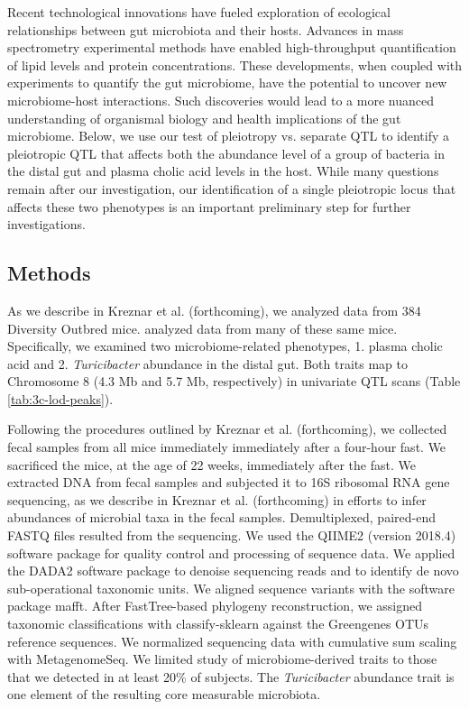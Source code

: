 \documentclass[oneside]{book}
\begin{document}
Recent technological innovations have fueled exploration of ecological relationships between gut microbiota and their hosts. Advances in mass spectrometry experimental methods have enabled high-throughput quantification of lipid levels and protein concentrations. These developments, when coupled with experiments to quantify the gut microbiome, have the potential to uncover new microbiome-host interactions. Such discoveries would lead to a more nuanced understanding of organismal biology and health implications of the gut microbiome. Below, we use our test of pleiotropy vs. separate QTL to identify a pleiotropic QTL that affects both the abundance level of a group of bacteria in the distal gut and plasma cholic acid levels in the host. While many questions remain after our investigation, our identification of a single pleiotropic locus that affects these two phenotypes is an important preliminary step for further investigations.  



\subsection{Methods}

As we describe in Kreznar et al. (forthcoming), we analyzed data from 384 Diversity Outbred mice. \citet{keller2018genetic} analyzed data from many of these same mice. Specifically, we examined two microbiome-related phenotypes, 1. plasma cholic acid and 2. \emph{Turicibacter} abundance in the distal gut. Both traits map to Chromosome 8 (4.3 Mb and 5.7 Mb, respectively) in univariate QTL scans (Table \ref{tab:3c-lod-peaks}).

Following the procedures outlined by Kreznar et al. (forthcoming), we collected fecal samples from all mice immediately immediately after a four-hour fast. We sacrificed the mice, at the age of 22 weeks, immediately after the fast. We extracted DNA from fecal samples and subjected it to 16S ribosomal RNA gene sequencing, as we describe in Kreznar et al. (forthcoming) in efforts to infer abundances of microbial taxa in the fecal samples. Demultiplexed, paired-end FASTQ files resulted from the sequencing. We used the QIIME2 (version 2018.4) software package for quality control and processing of sequence data. We applied the DADA2 software package to denoise sequencing reads and to identify de novo sub-operational taxonomic units. We aligned sequence variants with the software package mafft. After FastTree-based phylogeny reconstruction, we assigned taxonomic classifications with classify-sklearn against the Greengenes OTUs reference sequences. We normalized sequencing data with cumulative sum scaling with MetagenomeSeq. We limited study of microbiome-derived traits to those that we detected in at least 20\% of subjects. The \emph{Turicibacter} abundance trait is one element of the resulting core measurable microbiota. 
\end{document}

